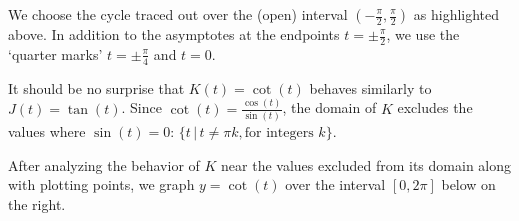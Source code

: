 \documentclass{ximera}
\begin{document}
\smallskip

We choose the cycle traced out  over the (open) interval $\left( -\frac{\pi}{2}, \frac{\pi}{2} \right)$ as highlighted above.  In addition to the asymptotes at the endpoints $t = \pm \frac{\pi}{2}$, we use the `quarter marks' $t = \pm \frac{\pi}{4}$ and $t = 0$. 

\smallskip

It should be no surprise that $K(t) = \cot(t)$ behaves similarly to $J(t)=\tan(t)$.  Since $\cot(t) = \frac{\cos(t)}{\sin(t)}$, the domain of $K$ excludes the values where $\sin(t) = 0$:   $\{ t \, | \, t \neq  \pi k, \text{for integers $k$} \}$.

\smallskip

After analyzing the behavior of $K$ near the values excluded from its domain  along with plotting points, we graph $y = \cot(t)$ over the interval $[0,2\pi]$ below on the right. 
\end{document}
